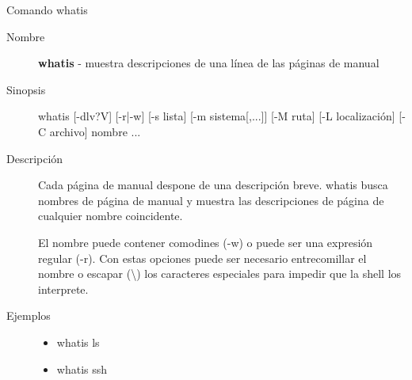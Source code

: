\begin{frame}[c]{Comando whatis}
  \begin{description}
    \item[Nombre]
      \textbf{whatis} - muestra descripciones de una línea de las páginas
      de manual

    \vspace{\baselineskip}
    \item[Sinopsis]
      whatis [-dlv?V] [-r|-w] [-s lista] [-m sistema[,...]] [-M ruta] [-L localización] [-C archivo] nombre ...
    \vspace{\baselineskip}
    \item[Descripción]
      Cada página de manual despone de una descripción breve. whatis busca
      nombres de página de manual y muestra las descripciones de página de
      cualquier nombre coincidente.

      El nombre puede contener comodines (-w) o puede ser una expresión
      regular (-r). Con estas opciones puede ser necesario entrecomillar el
      nombre o escapar (\textbackslash{}) los caracteres especiales para impedir que la
      shell los interprete.

    \vspace{\baselineskip}
    \item[Ejemplos]
      \begin{itemize}
        \item whatis ls
        \item whatis ssh
      \end{itemize}
  \end{description}
\end{frame}

